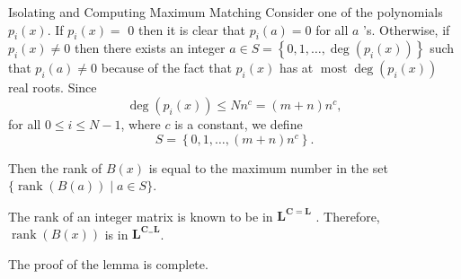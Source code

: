 \documentclass{beamer}
\begin{document}
\begin{frame}[allowframebreaks]{Isolating and Computing Maximum Matching}
	Consider one of the polynomials $p_i(x)$. If $p_i(x)=$ 0 then it is clear that $p_i(a)=0$ for all $a$ 's. Otherwise, if $p_i(x) \neq 0$ then there exists an integer $a \in S=\left\{0,1, \ldots, \operatorname{deg}\left(p_i(x)\right)\right\}$ such that $p_i(a) \neq 0$ because of the fact that $p_i(x)$ has at $\operatorname{most} \operatorname{deg}\left(p_i(x)\right)$ real roots. Since
	$$
	\operatorname{deg}\left(p_i(x)\right) \leq N n^c=(m+n) n^c,
	$$
	for all $0 \leq i \leq N-1$, where $c$ is a constant, we define
	$$
	S=\left\{0,1, \ldots,(m+n) n^c\right\} .
	$$
	
	Then the rank of $B(x)$ is equal to the maximum number in the set $\{\operatorname{rank}(B(a)) \mid a \in S\}$.
	
	The rank of an integer matrix is known to be in $\mathbf{L}^{\mathbf{C}=\mathbf{L}}$ . Therefore, $\operatorname{rank}(B(x))$ is in $\mathbf{L}^{\mathbf{C}_{=} \mathbf{L}}$.
	
	The proof of the lemma is complete.
	
\end{frame}
\end{document}
